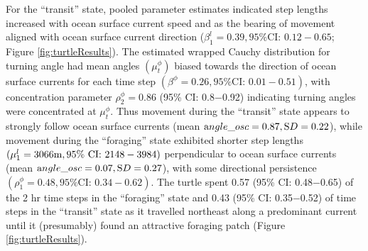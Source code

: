 \documentclass[12pt]{article}\usepackage[]{graphicx}\usepackage[]{color}
\begin{document}
For the ``transit'' state, pooled parameter estimates indicated step lengths increased with ocean surface current speed and as the bearing of movement aligned with ocean surface current direction ($\beta^l_1=0.39, \text{95\% CI: } 0.12-0.65$; Figure \ref{fig:turtleResults}). The estimated wrapped Cauchy distribution for turning angle had mean angles $(\mu^\phi_t)$ biased towards the direction of ocean surface currents for each time step $(\beta^\phi=0.26, \text{95\% CI: } 0.01-0.51)$, with concentration parameter $\rho^\phi_2=0.86$ (95\% CI: 0.8$-$0.92) indicating turning angles were concentrated at $\mu^\phi_t$. Thus movement during the ``transit'' state appears to strongly follow ocean surface currents (mean ${\text angle\_osc}=0.87,{\text SD}=0.22$), while movement during the ``foraging'' state exhibited shorter step lengths $(\mu^l_1=3066{\text m}, \text{95\% CI: } 2148-3984)$ perpendicular to ocean surface currents (mean ${\text angle\_osc}=0.07,{\text SD}=0.27$), with some directional persistence $(\rho^\phi_1=0.48, \text{95\% CI: } 0.34-0.62)$. The turtle spent 0.57 (95\% CI: 0.48$-$0.65) of the 2 hr time steps in the ``foraging'' state and 0.43 (95\% CI: 0.35$-$0.52) of time steps in the ``transit'' state as it travelled northeast along a predominant current until it (presumably) found an attractive foraging patch (Figure \ref{fig:turtleResults}).
\end{document}
